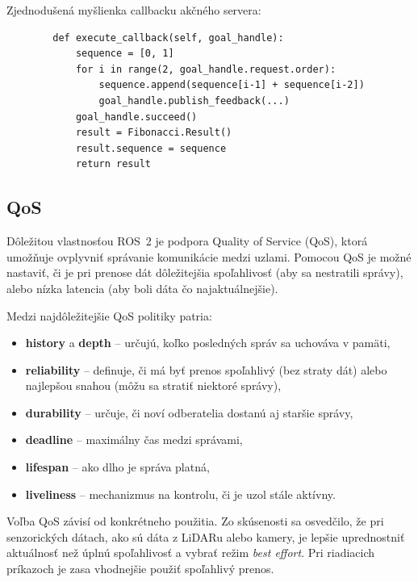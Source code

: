         Zjednodušená myšlienka callbacku akčného servera:
      
        \begin{verbatim}
        def execute_callback(self, goal_handle):
            sequence = [0, 1]
            for i in range(2, goal_handle.request.order):
                sequence.append(sequence[i-1] + sequence[i-2])
                goal_handle.publish_feedback(...)
            goal_handle.succeed()
            result = Fibonacci.Result()
            result.sequence = sequence
            return result
        \end{verbatim}
      
        \subsection*{QoS}
      
        Dôležitou vlastnosťou ROS~2 je podpora Quality of Service (QoS), ktorá umožňuje ovplyvniť správanie komunikácie medzi uzlami. Pomocou QoS je možné nastaviť, či je pri prenose dát dôležitejšia spoľahlivosť (aby sa nestratili správy), alebo nízka latencia (aby boli dáta čo najaktuálnejšie).
      
        Medzi najdôležitejšie QoS politiky patria:
        \begin{itemize}
            \item \textbf{history} a \textbf{depth} – určujú, koľko posledných správ sa uchováva v pamäti,
            \item \textbf{reliability} – definuje, či má byť prenos spoľahlivý (bez straty dát) alebo najlepšou snahou (môžu sa stratiť niektoré správy),
            \item \textbf{durability} – určuje, či noví odberatelia dostanú aj staršie správy,
            \item \textbf{deadline} – maximálny čas medzi správami,
            \item \textbf{lifespan} – ako dlho je správa platná,
            \item \textbf{liveliness} – mechanizmus na kontrolu, či je uzol stále aktívny.
        \end{itemize}
      
        Voľba QoS závisí od konkrétneho použitia. Zo skúsenosti sa osvedčilo, že pri senzorických dátach, ako sú dáta z LiDARu alebo kamery, je lepšie uprednostniť aktuálnosť než úplnú spoľahlivosť a vybrať režim \emph{best effort}. Pri riadiacich príkazoch je zasa vhodnejšie použiť spoľahlivý prenos.
      
